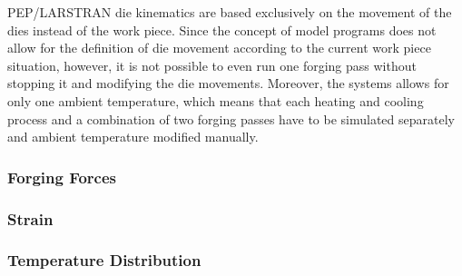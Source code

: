 PEP/LARSTRAN die kinematics are based exclusively on the movement of the dies instead of the work piece. Since the concept of model programs does not allow for the definition of die movement according to the current work piece situation, however, it is not possible to even run one forging pass without stopping it and modifying the die movements. Moreover, the systems allows for only one ambient temperature, which means that each heating and cooling process and a combination of two forging passes have to be simulated separately and ambient temperature modified manually.

\subsubsection{Forging Forces}

\subsubsection{Strain}

\subsubsection{Temperature Distribution}
